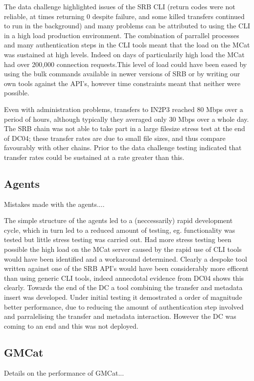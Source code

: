 \documentclass{cmspaper}
\begin{document}
The data challenge highlighted issues of the SRB CLI (return codes were not 
reliable, at times returning 0 despite failure, and some killed transfers continued to 
run in the background) and many problems can be attributed to using the CLI in
a high load production environment. The combination of parrallel processes and
many authentication steps in the CLI tools meant that the load on the MCat was 
sustained at high levels. Indeed on days of particularily high load the MCat
had over 200,000 connection requests.This level of load could have been 
eased by using the bulk commands available in newer versions of SRB or by 
writing our own tools against the API's, however time constraints meant that 
neither were possible.

Even with administration problems, transfers to IN2P3 reached 80 Mbps
over a period of hours, although typically they averaged only 30
Mbps over a whole day. The SRB chain was not able to take part in a
large filesize stress test at the end of DC04; these transfer rates
are due to small file sizes, and thus compare favourably with other
chains. Prior to the data challenge testing indicated that transfer
rates could be sustained at a rate greater than this.

\subsection{Agents}
Mistakes made with the agents....

The simple structure of the agents led to a (neccessarily) rapid development cycle, which 
in turn led to a reduced amount of testing, eg. functionality was tested but little stress 
testing was carried out. Had more stress testing been possible the high load on the MCat 
server caused by the rapid use of CLI tools would have been identified and a workaround 
determined. Clearly a despoke tool written against one of the SRB API's would have 
been considerably more efficent than using generic CLI tools, indeed annecdotal evidence from 
DC04 shows this clearly. Towards the end of the DC a tool combining the transfer and metadata
insert was developed. Under initial testing it demostrated a order of magnitude better
performance, due to reducing the amount of authentication step involved and parralelising the 
transfer and metadata interaction. However the DC was coming to an end and this was not deployed.

\subsection{GMCat}
Details on the performance of GMCat...
\end{document}
